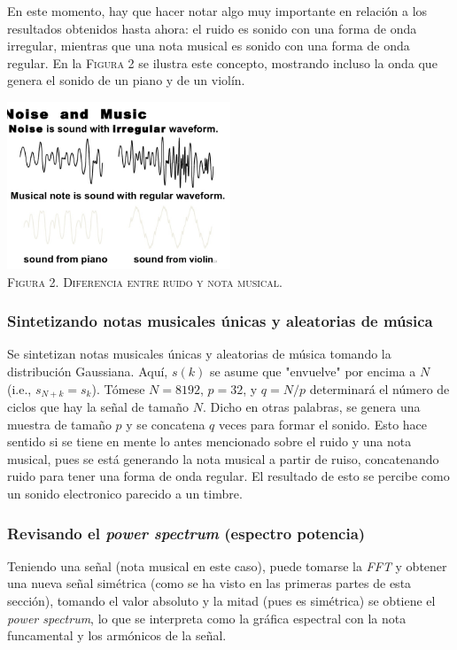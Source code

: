 \documentclass[a4paper]{article}
\begin{document}
\noindent En este momento, hay que hacer notar algo muy importante en relación a los resultados obtenidos hasta ahora: el ruido es sonido con una forma de onda irregular, mientras que una nota musical es sonido con una forma de onda regular. En la \textsc{Figura 2} se ilustra este concepto, mostrando incluso la onda que genera el sonido de un piano y de un violín.
\begin{center}
\includegraphics[width=0.5\textwidth]{soundwaves}\\
\textsc{Figura 2. Diferencia entre ruido y nota musical.}\\
\end{center}

\subsubsection{\sffamily Sintetizando notas musicales únicas y aleatorias de música}
\noindent Se sintetizan notas musicales únicas y aleatorias de música tomando la distribución Gaussiana. Aquí, $s(k)$ se asume que "envuelve" por encima a $N$ (i.e., $s_{N+k} = s_k$). Tómese $N = 8192$, $p = 32$, y $q = N / p$ determinará el número de ciclos que hay la señal de tamaño $N$. Dicho en otras palabras, se genera una muestra de tamaño $p$ y se concatena $q$ veces para formar el sonido. Esto hace sentido si se tiene en mente lo antes mencionado sobre el ruido y una nota musical, pues se está generando la nota musical a partir de ruiso, concatenando ruido para tener una forma de onda regular. El resultado de esto se percibe como un sonido electronico parecido a un timbre.

\subsubsection{\sffamily Revisando el \textit{power spectrum} (espectro potencia)}
\noindent Teniendo una señal (nota musical en este caso), puede tomarse la \textit{FFT} y obtener una nueva señal simétrica (como se ha visto en las primeras partes de esta sección), tomando el valor absoluto y la mitad (pues es simétrica) se obtiene el \textit{power spectrum}, lo que se interpreta como la gráfica espectral con la nota funcamental y los armónicos de la señal.
\end{document}
